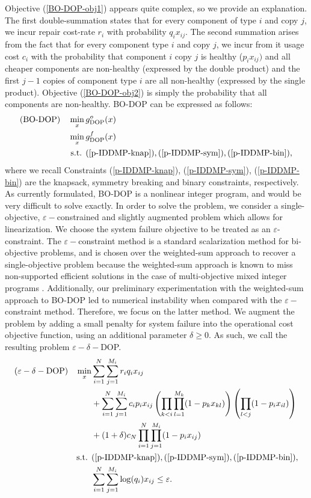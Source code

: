 \documentclass[11pt,authoryear,a4paper]{article}
\theoremstyle{definition}
\begin{document}
Objective (\ref{BO-DOP-obj1}) appears quite complex, so we provide an explanation. The first double-summation states that for every component of type $i$ and copy $j$, we incur repair cost-rate $r_i$ with probability $q_ix_{ij}$. The second summation arises from the fact that for every component type $i$ and copy $j$, we incur from it usage cost $c_i$ with the probability that component $i$ copy $j$ is healthy ($p_ix_{ij})$ and all cheaper components are non-healthy (expressed by the double product) and the first $j-1$ copies of component type $i$ are all non-healthy (expressed by the single product). Objective (\ref{BO-DOP-obj2}) is simply the probability that all components are non-healthy. BO-DOP can be expressed as follows:
\begin{align*}
    \text{(BO-DOP)}\quad \min_x\,      & g^o_{\text{DOP}}(x)\\
                    \min_x\,      & g^f_{\text{DOP}}(x)\\
                    \text{s.t. } & (\ref{p-IDDMP-knap}), (\ref{p-IDDMP-sym}), (\ref{p-IDDMP-bin}),
\end{align*}   
where we recall Constraints (\ref{p-IDDMP-knap}), (\ref{p-IDDMP-sym}), (\ref{p-IDDMP-bin}) are the knapsack, symmetry breaking and binary constraints, respectively. As currently formulated, BO-DOP is a nonlinear integer program, and would be very difficult to solve exactly. In order to solve the problem, we consider a single-objective, $\varepsilon-$constrained and slightly augmented problem which allows for linearization. We choose the system failure objective to be treated as an $\varepsilon$-constraint. The $\varepsilon-$constraint method is a standard scalarization method for bi-objective problems, and is chosen over the weighted-sum approach to recover a single-objective problem because the weighted-sum approach is known to miss non-supported efficient solutions in the case of multi-objective mixed integer programs \citep{ehrgott2005multicriteria}. Additionally, our preliminary experimentation with the weighted-sum approach to BO-DOP led to numerical instability when compared with the $\varepsilon-$constraint method. Therefore, we focus on the latter method. We augment the problem by adding a small penalty for system failure into the operational cost objective function, using an additional parameter $\delta \geq 0$. As such, we call the resulting problem $\varepsilon-\delta-$DOP.
\begin{align}
    &(\varepsilon-\delta-\text{DOP}) &\min_x & \sum_{i=1}^N\sum_{j=1}^{M_i}  r_iq_ix_{ij} \nonumber\\ &&&+\sum_{i=1}^N\sum_{j=1}^{M_i}c_ip_ix_{ij}\left(\prod_{k<i}\prod_{l=1}^{M_k}(1 - p_kx_{kl})\right)\left(\prod_{l<j}(1 - p_ix_{il})\right) \nonumber\\
    &&&+(1+\delta)c_N\prod_{i=1}^N\prod_{j=1}^{M_i}(1-p_ix_{ij})\label{e-DOP-obj}\\
    &&\text{s.t. }& (\ref{p-IDDMP-knap}), (\ref{p-IDDMP-sym}), (\ref{p-IDDMP-bin}), \label{e-DOP-other}\\
    &&&\sum_{i=1}^N\sum_{j=1}^{M_i}\log(q_i)x_{ij} \leq \varepsilon. \label{e-DOP-epsilon}
\end{align}
\end{document}
